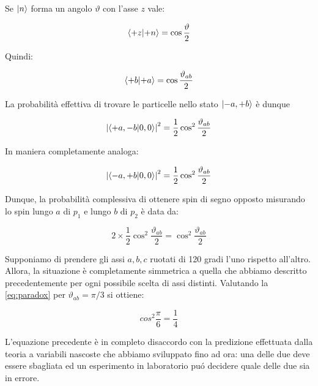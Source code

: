 Se $\ket{n}$ forma un angolo $\vartheta$ con l'asse $z$ vale:

	\begin{equation}
		\braket{+z}{+n} = \cos \frac{\vartheta}{2}
	\end{equation}

Quindi:

	\begin{equation}
		\braket{+b}{+a} = \cos \frac{\vartheta_{ab}}{2}
	\end{equation}

La probabilit\`a effettiva di trovare le particelle nello stato $\ket{-a, +b}$ \`e dunque

	\begin{equation}
		\left | \braket{+a, -b}{0, 0} \right | ^ 2  = \frac{1}{2} \cos^2 \frac{\vartheta_{ab}}{2}
	\end{equation}

In maniera completamente analoga:

	\begin{equation}
		\left | \braket{-a, +b}{0, 0} \right | ^ 2  = \frac{1}{2} \cos^2 \frac{\vartheta_{ab}}{2}
	\end{equation}

Dunque, la probabilit\`a complessiva di ottenere spin di segno opposto misurando lo spin lungo $a$ di $p_1$ e lungo $b$ di $p_2$ \`e data da:

	\begin{equation} \label{eq:paradox}
		2 \times \frac{1}{2} \cos ^2 \frac{\vartheta_{ab}}{2} = \cos^2 \frac{\vartheta_{ab}}{2}
	\end{equation}

Supponiamo di prendere gli assi $a, b, c$ ruotati di 120 gradi l'uno rispetto all'altro. Allora, la situazione \`e completamente simmetrica a quella che abbiamo descritto precedentemente per ogni possibile scelta di assi distinti. Valutando la \eqref{eq:paradox} per $\vartheta_{ab} = \pi / 3$ si ottiene:

	\begin{equation}
		cos^2 \frac{\pi}{6} = \frac{1}{4}
	\end{equation}

L'equazione precedente \`e in completo disaccordo con la predizione effettuata dalla teoria a variabili nascoste che abbiamo sviluppato fino ad ora: una delle due deve essere sbagliata ed un esperimento in laboratorio pu\'o decidere quale delle due sia in errore.

